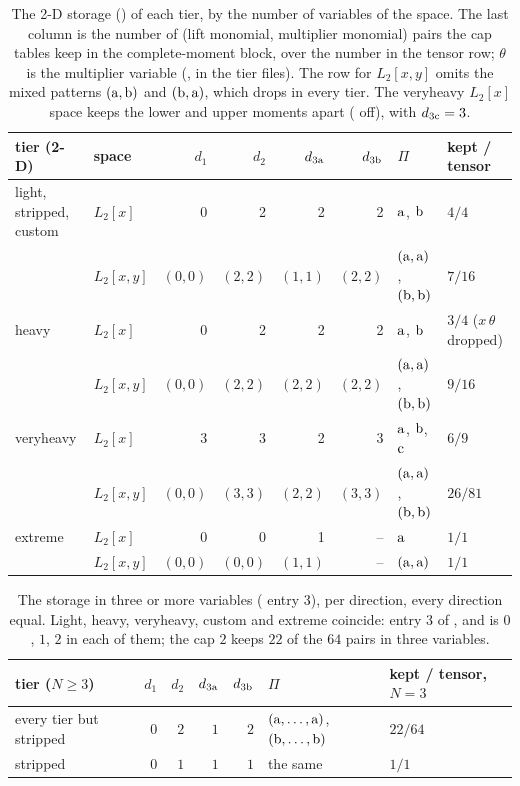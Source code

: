 \begin{table}[h]\centering\footnotesize
\setlength{\tabcolsep}{3pt}
\begin{tabular}{llrrrrll}
\toprule
tier (2-D) & space & $d_1$ & $d_2$ & $d_{3\mathrm{a}}$ & $d_{3\mathrm{b}}$ & $\Pi$ & kept / tensor \\
\midrule
light, stripped, custom & $L_2[x]$ & 0 & 2 & 2 & 2 & $\mathrm{a}$, $\mathrm{b}$ & $4/4$ \\
 & $L_2[x,y]$ & $(0,0)$ & $(2,2)$ & $(1,1)$ & $(2,2)$ & $(\mathrm{a},\mathrm{a})$, $(\mathrm{b},\mathrm{b})$ & $7/16$ \\
heavy & $L_2[x]$ & 0 & 2 & 2 & 2 & $\mathrm{a}$, $\mathrm{b}$ & $3/4$ ($x\,\theta$ dropped) \\
 & $L_2[x,y]$ & $(0,0)$ & $(2,2)$ & $(2,2)$ & $(2,2)$ & $(\mathrm{a},\mathrm{a})$, $(\mathrm{b},\mathrm{b})$ & $9/16$ \\
veryheavy & $L_2[x]$ & 3 & 3 & 2 & 3 & $\mathrm{a}$, $\mathrm{b}$, $\mathrm{c}$ & $6/9$ \\
 & $L_2[x,y]$ & $(0,0)$ & $(3,3)$ & $(2,2)$ & $(3,3)$ & $(\mathrm{a},\mathrm{a})$, $(\mathrm{b},\mathrm{b})$ & $26/81$ \\
extreme & $L_2[x]$ & 0 & 0 & 1 & -- & $\mathrm{a}$ & $1/1$ \\
 & $L_2[x,y]$ & $(0,0)$ & $(0,0)$ & $(1,1)$ & -- & $(\mathrm{a},\mathrm{a})$ & $1/1$ \\
\bottomrule
\end{tabular}
\caption{The 2-D storage () of each tier, by the number of variables of the space. The last column is the number of (lift monomial, multiplier monomial) pairs the cap tables keep in the complete-moment block, over the number in the tensor row; $\theta$ is the multiplier variable (,  in the tier files). The row for $L_2[x,y]$ omits the mixed patterns $(\mathrm{a},\mathrm{b})$ and $(\mathrm{b},\mathrm{a})$, which  drops in every tier. The veryheavy $L_2[x]$ space keeps the lower and upper moments apart ( off), with $d_{3\mathrm{c}}=3$.}\label{tab:2d}
\end{table}

\begin{table}[h]\centering\footnotesize
\setlength{\tabcolsep}{6pt}
\begin{tabular}{lrrrrll}
\toprule
tier ($N\ge3$) & $d_1$ & $d_2$ & $d_{3\mathrm{a}}$ & $d_{3\mathrm{b}}$ & $\Pi$ & kept / tensor, $N=3$ \\
\midrule
every tier but stripped & $0$ & $2$ & $1$ & $2$ & $(\mathrm{a},\dots,\mathrm{a})$, $(\mathrm{b},\dots,\mathrm{b})$ & $22/64$ \\
stripped & $0$ & $1$ & $1$ & $1$ & the same & $1/1$ \\
\bottomrule
\end{tabular}
\caption{The storage in three or more variables ( entry 3), per direction, every direction equal. Light, heavy, veryheavy, custom and extreme coincide: entry 3 of ,  and  is $0$, $1$, $2$ in each of them; the  cap $2$ keeps $22$ of the $64$ pairs in three variables.}\label{tab:nd}
\end{table}

